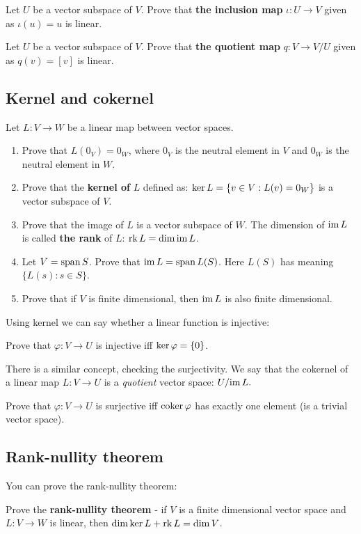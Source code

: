\begin{prob}
  Let $U$ be a vector subspace of $V$. Prove that \textbf{the inclusion map} $\iota : U\to V$ given as $\iota(u)=u$ is linear.
\end{prob}

\begin{prob}
  Let $U$ be a vector subspace of $V$. Prove that \textbf{the quotient map} $q: V\to V/U$ given as $q(v)=[v]$ is linear.
\end{prob}

\subsection{Kernel and cokernel}
\begin{prob}
  Let $L:V\to W$ be a linear map between vector spaces.
  \begin{enumerate}
    \item Prove that $L(0_V)=0_W$, where $0_V$ is the neutral element in $V$ and $0_W$ is the neutral element in $W$.
    \item Prove that the \textbf{kernel of} $L$ defined as: $\text{ker\,} L = \{v\in V : L(v) = 0_W\}$ is a vector subspace of $V$.
    \item Prove that the image of $L$ is a vector subspace of $W$. The dimension of $\text{im\,} L$ is called \textbf{the rank} of $L$: $\text{rk\,} L = \dim \text{im\,} L$.
    \item Let $V=\text{span\,} S$. Prove that $\text{im\,} L=\text{span\,} L(S)$. Here $L(S)$ has meaning $\{L(s) : s\in S\}$.
    \item Prove that if $V$ is finite dimensional, then $\text{im\,} L$ is also finite dimensional.
  \end{enumerate}
\end{prob}

Using kernel we can say whether a linear function is injective:
\begin{prob}
  Prove that $\varphi : V\to U$ is injective iff $\text{ker\,} \varphi = \{0\}$.
\end{prob}

There is a similar concept, checking the surjectivity. We say that the cokernel of a linear map $L: V\to U$ is a \textit{quotient} vector space: $U/\text{im\,} L.$

\begin{prob}
  Prove that $\varphi : V\to U$ is surjective iff $\text{coker\,} \varphi$ has exactly one element (is a trivial vector space).
\end{prob}

\subsection{Rank-nullity theorem}
You can prove the rank-nullity theorem:
\begin{prob}
  Prove the \textbf{rank-nullity theorem} - if $V$ is a finite dimensional vector space and $L:V\to W$ is linear, then $\dim \text{ker\,} L + \text{rk\,} L=\dim V$.
\end{prob}

